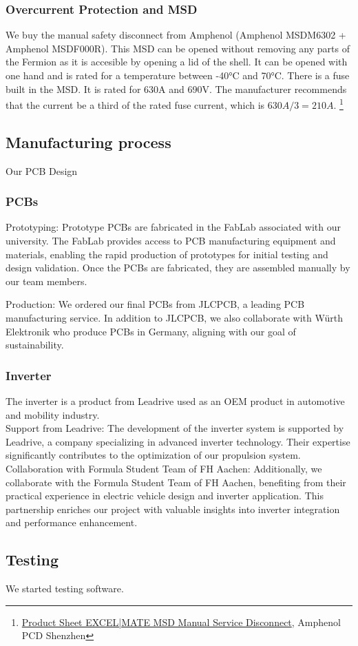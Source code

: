 \subsubsection*{Overcurrent Protection and MSD}
We buy the manual safety disconnect from Amphenol (Amphenol MSDM6302 + Amphenol MSDF000R). This MSD can be opened without removing any parts of the Fermion as it is accesible by opening a lid of the shell. It can be opened with one hand and is rated for a temperature between -40°C and 70°C. There is a fuse built in the MSD. It is rated for 630A and 690V. The manufacturer recommends that the current be a third of the rated fuse current, which is \(630A/3 = 210A\). \footnote{\href{https://www.amphenol-industrial.de/de/amph/download/viewFile/MTA0}{Product Sheet EXCEL|MATE MSD
Manual Service Disconnect}, Amphenol PCD Shenzhen} \\


\subsection{Manufacturing process}
Our PCB Design
\subsubsection{PCBs}
\par Prototyping: Prototype PCBs are fabricated in the FabLab associated with our university. The FabLab provides access to PCB manufacturing equipment and materials, enabling the rapid production of prototypes for initial testing and design validation.
    Once the PCBs are fabricated, they are assembled manually by our team members. 
\par Production: We ordered our final PCBs from JLCPCB, a leading PCB manufacturing service. In addition to JLCPCB, we also collaborate with Würth Elektronik who produce 
PCBs in Germany, aligning with our goal of sustainability.

\subsubsection{Inverter}
The inverter is a product from Leadrive used as an OEM product in automotive and mobility industry. \\

    Support from Leadrive: The development of the inverter system is supported by Leadrive, a company specializing in advanced inverter technology. Their expertise significantly contributes to the optimization of our propulsion system.
    Collaboration with Formula Student Team of FH Aachen: Additionally, we collaborate with the Formula Student Team of FH Aachen, benefiting from their practical experience in electric vehicle design and inverter application. This partnership enriches our project with valuable insights into inverter integration and performance enhancement.

\subsection{Testing}
We started testing software.

